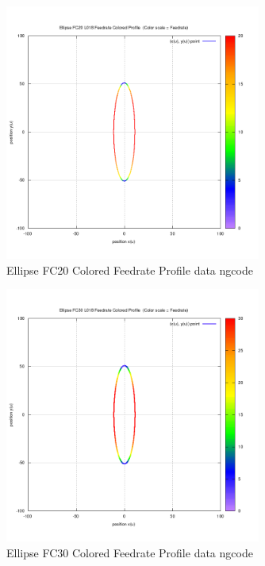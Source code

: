 \begin{figure}
	\caption     {Ellipse FC20 Colored Feedrate Profile data ngcode}
	\label{18-img-Ellipse-FC20-Colored-Feedrate-Profile-data_ngcode.png}
	\includegraphics[width=0.75\textwidth]{Chap4/appendix/app-Ellipse/plots/18-img-Ellipse-FC20-Colored-Feedrate-Profile-data_ngcode.png}
\end{figure}

\clearpage
\pagebreak

\begin{figure}
	\caption     {Ellipse FC30 Colored Feedrate Profile data ngcode}
	\label{19-img-Ellipse-FC30-Colored-Feedrate-Profile-data_ngcode.png}
	\includegraphics[width=0.75\textwidth]{Chap4/appendix/app-Ellipse/plots/19-img-Ellipse-FC30-Colored-Feedrate-Profile-data_ngcode.png}
\end{figure}


